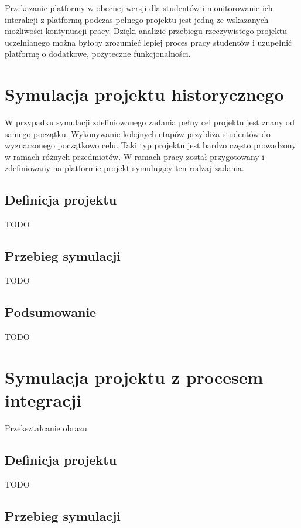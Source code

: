 Przekazanie platformy w obecnej wersji dla studentów i monitorowanie ich interakcji z platformą podczas pełnego projektu jest jedną ze wskazanych możliwości kontynuacji pracy.
Dzięki analizie przebiegu rzeczywistego projektu uczelnianego można byłoby zrozumieć lepiej proces pracy studentów i uzupełnić platformę o dodatkowe, pożyteczne funkcjonalności.


\section{Symulacja projektu historycznego}
\label{research_penguins}

W przypadku symulacji zdefiniowanego zadania pełny cel projektu jest znany od samego początku.
Wykonywanie kolejnych etapów przybliża studentów do wyznaczonego początkowo celu.
Taki typ projektu jest bardzo często prowadzony w ramach różnych przedmiotów.
W ramach pracy został przygotowany i zdefiniowany na platformie projekt symulujący ten rodzaj zadania.


\subsection{Definicja projektu}

TODO


\subsection{Przebieg symulacji}

TODO


\subsection{Podsumowanie}

TODO


\section{Symulacja projektu z procesem integracji}
\label{research_image}


Przekształcanie obrazu


\subsection{Definicja projektu}

TODO


\subsection{Przebieg symulacji}

